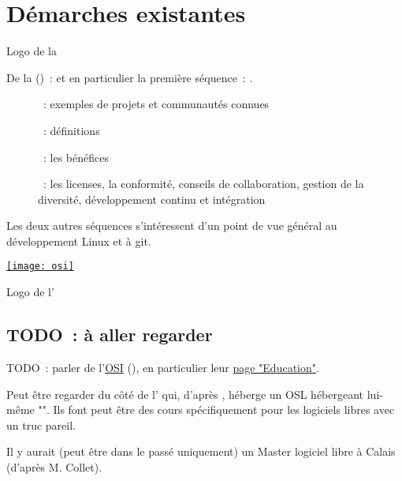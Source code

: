 \chapter{Démarches existantes}

\begin{marginfigure}
    \href{https://www.linuxfoundation.org/}{}
    \caption{Logo de la }
\end{marginfigure}

De la  () :
  \href{https://www.edx.org/professional-certificate/linuxfoundationx-open-source-software-development-linux-and-git}
  {}
et en particulier la première séquence :
  \href{https://www.edx.org/course/open-source-software-development-linux-for-developers}
  {}.

\begin{description}
    \item[] : exemples de projets et communautés connues
    \item[] : définitions
    \item[] : les bénéfices
    \item[] : les licenses, la conformité, conseils de collaboration, gestion de la
        diversité, développement continu et intégration
\end{description}

Les deux autres séquences s'intéressent d'un point de vue général au développement Linux et à git.

\begin{marginfigure}
    \href{https://opensource.org/}{\texttt{[image: osi]}}
    \caption{Logo de l'}
\end{marginfigure}

\section{TODO : à aller regarder}

TODO : parler de l'\href{https://opensource.org/}{OSI} (), en particulier leur
\href{https://opensource.org/osi-open-source-education}{page "Education"}.

Peut être regarder du côté de l' qui, d'après \textcite{barriers-2018}, héberge un
\acrfull{OSL} hébergeant lui-même "". Ils
    font peut être des cours spécifiquement pour les logiciels libres avec un truc pareil.

Il y aurait (peut être dans le passé uniquement) un Master logiciel libre à Calais (d'après M. Collet).
